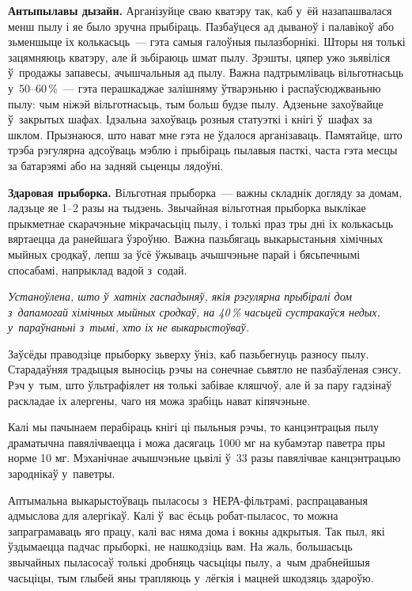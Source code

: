 \textbf{Антыпылавы дызайн.} Арганізуйце сваю кватэру так, каб у~ёй назапашвалася менш пылу і яе было зручна прыбіраць. Пазбаўцеся ад дываноў і палавікоў або зьменшыце іх колькасьць~--- гэта самыя галоўныя пылазборнікі. Шторы ня толькі зацямняюць кватэру, але й зьбіраюць шмат пылу. Зрэшты, цяпер ужо зьявіліся ў~продажы запавесы, ачышчальныя ад пылу. Важна падтрымліваць вільготнасьць у~50--60\,\%~--- гэта перашкаджае залішняму ўтварэньню і распаўсюджваньню пылу: чым ніжэй вільготнасьць, тым больш будзе пылу. Адзеньне захоўвайце ў~закрытых шафах. Ідэальна захоўваць розныя статуэткі і кнігі ў~шафах за шклом. Прызнаюся, што нават мне гэта не ўдалося арганізаваць. Памятайце, што трэба рэгулярна адсоўваць мэблю і прыбіраць пылавыя пасткі, часта гэта месцы за батарэямі або на задняй сьценцы лядоўні.

\textbf{Здаровая прыборка.} Вільготная прыборка~--- важны складнік догляду за домам, ладзьце яе 1--2 разы на тыдзень. Звычайная вільготная прыборка выклікае прыкметнае скарачэньне мікрачасьціц пылу, і толькі праз тры дні іх колькасьць вяртаецца да ранейшага ўзроўню. Важна пазьбягаць выкарыстаньня хімічных мыйных сродкаў, лепш за ўсё ўжываць ачышчэньне парай і бясьпечнымі спосабамі, напрыклад вадой з~содай.

\emph{Устаноўлена, што ў~хатніх гаспадыняў, якія рэгулярна прыбіралі дом з~дапамогай хімічных мыйных сродкаў, на 40\,\% часьцей сустракаўся недых, у~параўнаньні з~тымі, хто іх не выкарыстоўваў.}

Заўсёды праводзіце прыборку зьверху ўніз, каб пазьбегнуць разносу пылу. Старадаўняя традыцыя выносіць рэчы на сонечнае сьвятло не пазбаўленая сэнсу. Рэч у~тым, што ўльтрафіялет ня толькі забівае кляшчоў, але й за пару гадзінаў раскладае іх алергены, чаго ня можа зрабіць нават кіпячэньне.

Калі мы пачынаем перабіраць кнігі ці пыльныя рэчы, то канцэнтрацыя пылу драматычна павялічваецца і можа дасягаць 1000 мг на кубамэтар паветра пры норме 10 мг. Мэханічнае ачышчэньне цьвілі ў~33 разы павялічвае канцэнтрацыю зароднікаў у~паветры.


Аптымальна выкарыстоўваць пыласосы з~НЕРА-фільтрамі, распрацаваныя адмыслова для алергікаў. Калі ў~вас ёсьць робат-пыласос, то можна запраграмаваць яго працу, калі вас няма дома і вокны адкрытыя. Так пыл, які ўздымаецца падчас прыборкі, не нашкодзіць вам. На жаль, большасьць звычайных пыласосаў толькі дробняць часьціцы пылу, а~чым драбнейшыя часьціцы, тым глыбей яны трапляюць у~лёгкія і мацней шкодзяць здароўю.

